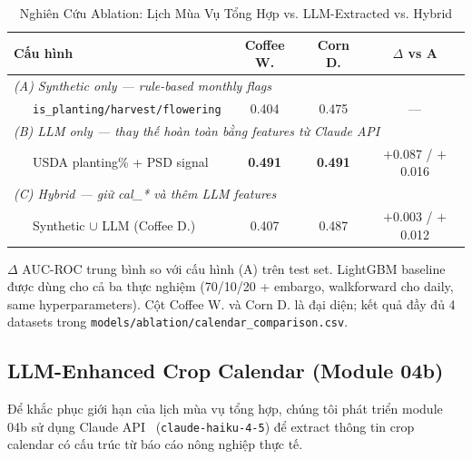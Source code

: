 \begin{table}[htbp]
\caption{Nghiên Cứu Ablation: Lịch Mùa Vụ Tổng Hợp vs. LLM-Extracted vs. Hybrid}
\label{tab:llm_ablation}
\centering
\begin{threeparttable}
\begin{tabular}{@{}lccc@{}}
\toprule
\textbf{Cấu hình}
  & \textbf{Coffee W.}
  & \textbf{Corn D.}
  & \textbf{$\Delta$ vs A\tnote{a}} \\
\midrule
\multicolumn{4}{l}{\textit{(A) Synthetic only — rule-based monthly flags}} \\
\midrule
~~~\texttt{is\_planting/harvest/flowering} & 0.404 & 0.475 & — \\
\midrule
\multicolumn{4}{l}{\textit{(B) LLM only — thay thế hoàn toàn bằng features từ Claude API}} \\
\midrule
~~~USDA planting\% + PSD signal    & \textbf{0.491} & \textbf{0.491} & $+$0.087 / $+$0.016 \\
\midrule
\multicolumn{4}{l}{\textit{(C) Hybrid — giữ cal\_* và thêm LLM features}} \\
\midrule
~~~Synthetic $\cup$ LLM (Coffee D.) & 0.407 & 0.487 & $+$0.003 / $+$0.012 \\
\bottomrule
\end{tabular}
\begin{tablenotes}
\footnotesize
\item[a] $\Delta$ AUC-ROC trung bình so với cấu hình (A) trên test set.
         LightGBM baseline được dùng cho cả ba thực nghiệm (70/10/20 + embargo,
         walkforward cho daily, same hyperparameters).
         Cột Coffee W. và Corn D. là đại diện; kết quả đầy đủ 4 datasets
         trong \texttt{models/ablation/calendar\_comparison.csv}.
\end{tablenotes}
\end{threeparttable}
\end{table}



\subsection{LLM-Enhanced Crop Calendar (Module 04b)}
\label{subsec:llm_calendar}

Để khắc phục giới hạn của lịch mùa vụ tổng hợp, chúng tôi phát triển module 04b
sử dụng Claude API~\cite{anthropic2024claude} (\texttt{claude-haiku-4-5}) để extract
thông tin crop calendar có cấu trúc từ báo cáo nông nghiệp thực tế.

